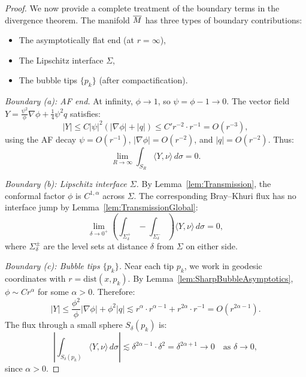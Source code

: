 \begin{proof}
We now provide a complete treatment of the boundary terms in the divergence theorem. The manifold $\overline{M}$ has three types of boundary contributions:
\begin{itemize}
    \item[(a)] The asymptotically flat end (at $r = \infty$),
    \item[(b)] The Lipschitz interface $\Sigma$,
    \item[(c)] The bubble tips $\{p_k\}$ (after compactification).
\end{itemize}

\textit{Boundary (a): AF end.} At infinity, $\phi \to 1$, so $\psi = \phi - 1 \to 0$. The vector field $Y = \frac{\psi^2}{\phi}\nabla\phi + \frac{1}{4}\psi^2 q$ satisfies:
\begin{equation}
    |Y| \le C |\psi|^2 (|\nabla\phi| + |q|) \le C' r^{-2} \cdot r^{-1} = O(r^{-3}),
\end{equation}
using the AF decay $\psi = O(r^{-1})$, $|\nabla\phi| = O(r^{-2})$, and $|q| = O(r^{-2})$. Thus:
\begin{equation}
    \lim_{R \to \infty} \int_{S_R} \langle Y, \nu \rangle \, d\sigma = 0.
\end{equation}

\textit{Boundary (b): Lipschitz interface $\Sigma$.} By Lemma~\ref{lem:Transmission}, the conformal factor $\phi$ is $C^{1,\alpha}$ across $\Sigma$. The corresponding Bray--Khuri flux has no interface jump by Lemma~\ref{lem:TransmissionGlobal}:
\begin{equation}
    \lim_{\delta \to 0^+} \left( \int_{\Sigma^+_\delta} - \int_{\Sigma^-_\delta} \right) \langle Y, \nu \rangle \, d\sigma = 0,
\end{equation}
where $\Sigma^\pm_\delta$ are the level sets at distance $\delta$ from $\Sigma$ on either side.

\textit{Boundary (c): Bubble tips $\{p_k\}$.} Near each tip $p_k$, we work in geodesic coordinates with $r = \text{dist}(x, p_k)$. By Lemma~\ref{lem:SharpBubbleAsymptotics}, $\phi \sim C r^\alpha$ for some $\alpha > 0$. Therefore:
\begin{equation}
    |Y| \le \frac{\phi^2}{\phi} |\nabla\phi| + \phi^2 |q| \lesssim r^\alpha \cdot r^{\alpha-1} + r^{2\alpha} \cdot r^{-1} = O(r^{2\alpha-1}).
\end{equation}
The flux through a small sphere $S_\delta(p_k)$ is:
\begin{equation}
    \left| \int_{S_\delta(p_k)} \langle Y, \nu \rangle \, d\sigma \right| \lesssim \delta^{2\alpha-1} \cdot \delta^2 = \delta^{2\alpha+1} \to 0 \quad \text{as } \delta \to 0,
\end{equation}
since $\alpha > 0$.


\end{proof}
